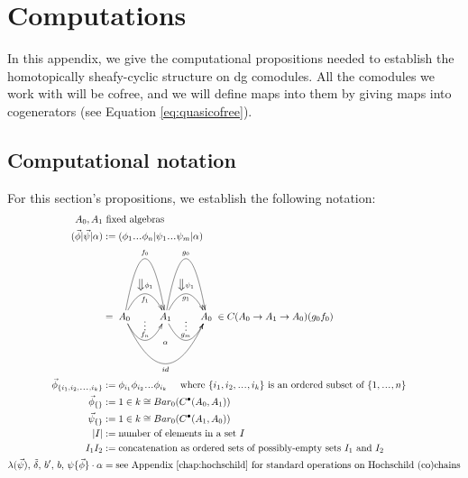 \chapter{Computations}
In this appendix, we give the 
computational propositions 
needed to establish the 
homotopically sheafy-cyclic structure 
on dg comodules. All the comodules we work 
with will be cofree, 
and we will define maps into them by 
giving maps into cogenerators 
(see Equation \ref{eq:quasicofree}).

\section{Computational notation}
For this section's propositions, we 
establish the following notation:
\begin{align*}
A_0, A_1 
&\textrm{ fixed algebras}\\
(\vec{\phi} | \vec{\psi} | \alpha) 
&:= 
(\phi_1\smdots\phi_n | \psi_1\smdots\psi_m| \alpha)\\
&= 
\xymatrix{
A_0 \ar@/^5pc/[r]^{f_0} 
\ar@/^2pc/[r]^{\big\Downarrow \phi_1}_{f_1} 
\ar@/_2pc/[r]^{\substack{\vdots\\ f_n}}
\ar@/_4pc/[rr]_{id}^{\substack{\alpha \\ \\ \\ \\ }}
& A_1 \ar@/^5pc/[r]^{g_0} 
\ar@/^2pc/[r]^{\big\Downarrow \psi_1}_{g_1} 
\ar@/_2pc/[r]^{\substack{\vdots\\ g_m}}
& A_0
}
\in C(A_0 \to A_1 \to A_0)(g_0f_0)\\
\vec{\phi}_{\{i_1, i_2,\smdots, i_k\}}
&:= 
\phi_{i_1}\phi_{i_2}\smdots\phi_{i_k}
 \quad \textrm{ where $\{i_1, i_2,\smdots, i_k\}$ 
 is an ordered subset of $\{1,\smdots,n\}$}\\
\vec{\phi}_{\{\}}
&:= 
1 \in k \cong Bar_0(C^\bullet(A_0, A_1))\\
\vec{\psi}_{\{\}}
&:= 
1 \in k \cong Bar_0(C^\bullet(A_1, A_0))\\
|I| 
&:=
\textrm{number of elements in a set $I$}\\
I_1I_2 
&:= 
\textrm{concatenation as ordered sets 
of possibly-empty sets $I_1$ and $I_2$}\\
\lambda({\vec{\psi}}),\, \tilde{\delta},\, 
b^\prime,\, b,\, \psi\{\vec{\phi}\}\cdot \alpha
&=
\textrm{see Appendix \ref{chap:hochschild} 
for standard operations on Hochschild (co)chains}\\
\end{align*}
%
